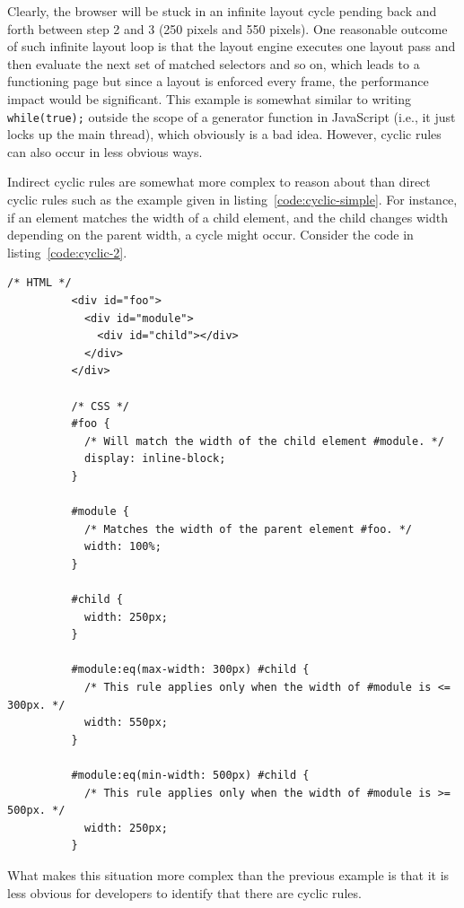 \documentclass[a4paper,11pt]{kth-mag}
\newcommand{\code}[1]{\texttt{#1}}
\begin{document}
        Clearly, the \gls{browser} will be stuck in an infinite layout cycle pending back and forth between step 2 and 3 (250 pixels and 550 pixels).
        One reasonable outcome of such infinite layout loop is that the \gls{layout engine} executes one layout pass and then evaluate the next set of matched selectors and so on, which leads to a functioning page but since a layout is enforced every frame, the performance impact would be significant.
        This example is somewhat similar to writing \code{while(true);} outside the scope of a generator function in \gls{JavaScript} (i.e., it just locks up the main thread), which obviously is a bad idea.
        However, cyclic rules can also occur in less obvious ways.

        Indirect cyclic rules are somewhat more complex to reason about than direct cyclic rules such as the example given in listing~\ref{code:cyclic-simple}.
        For instance, if an \gls{element} matches the width of a child \gls{element}, and the child changes width depending on the parent width, a cycle might occur.
        Consider the code in listing~\ref{code:cyclic-2}.
        \begin{lstlisting}[gobble=10,caption={Example of indirect cyclic rules. Here the user (\code{\#foo}) of the module (\code{\#module}) creates cyclic rules indirectly by specifying that it should match the width of the module.}, captionpos=b, label={code:cyclic-2}]
          /* HTML */
          <div id="foo">
            <div id="module">
              <div id="child"></div>
            </div>
          </div>

          /* CSS */
          #foo {
            /* Will match the width of the child element #module. */
            display: inline-block;
          }

          #module {
            /* Matches the width of the parent element #foo. */
            width: 100%;
          }

          #child {
            width: 250px;
          }

          #module:eq(max-width: 300px) #child {
            /* This rule applies only when the width of #module is <= 300px. */
            width: 550px;
          }

          #module:eq(min-width: 500px) #child {
            /* This rule applies only when the width of #module is >= 500px. */
            width: 250px;
          }
        \end{lstlisting}
        What makes this situation more complex than the previous example is that it is less obvious for developers to identify that there are cyclic rules.
\end{document}
